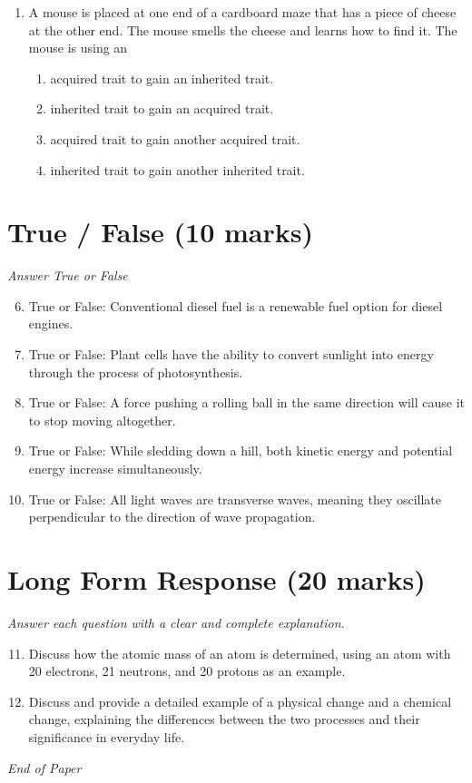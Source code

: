 \documentclass[12pt]{article}
\begin{document}
\begin{enumerate}[label=\arabic*.]
\begin{enumerate}[label=(\alph*)]
    \item Closing an electric circuit has produced light.
    \item Opening an electric circuit has produced light.
\end{enumerate}
\item A mouse is placed at one end of a cardboard maze that has a piece of cheese at the other end. The mouse smells the cheese and learns how to find it. The mouse is using an
\begin{enumerate}[label=(\alph*)]
    \item acquired trait to gain an inherited trait.
    \item inherited trait to gain an acquired trait.
    \item acquired trait to gain another acquired trait.
    \item inherited trait to gain another inherited trait.
\end{enumerate}
\end{enumerate}

\section*{True / False (10 marks)}
\textit{Answer True or False}
\begin{enumerate}[label=\arabic*.]
\setcounter{enumi}{5}
\item True or False: Conventional diesel fuel is a renewable fuel option for diesel engines.
\item True or False: Plant cells have the ability to convert sunlight into energy through the process of photosynthesis.
\item True or False: A force pushing a rolling ball in the same direction will cause it to stop moving altogether.
\item True or False: While sledding down a hill, both kinetic energy and potential energy increase simultaneously.
\item True or False: All light waves are transverse waves, meaning they oscillate perpendicular to the direction of wave propagation.
\end{enumerate}

\section*{Long Form Response (20 marks)}
\textit{Answer each question with a clear and complete explanation.}
\begin{enumerate}[label=\arabic*.]
\setcounter{enumi}{10}
\item Discuss how the atomic mass of an atom is determined, using an atom with 20 electrons, 21 neutrons, and 20 protons as an example.
\item Discuss and provide a detailed example of a physical change and a chemical change, explaining the differences between the two processes and their significance in everyday life.
\end{enumerate}

\vfill
\noindent\textit{End of Paper}
\end{document}
